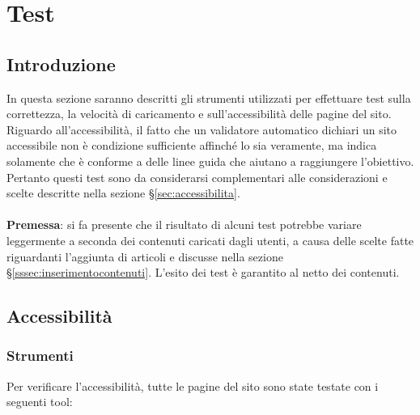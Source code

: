 \documentclass[12pt]{article}
\begin{document}
	\newpage
	\appendix
	
	\section{Test}
	\subsection{Introduzione}
	In questa sezione saranno descritti gli strumenti utilizzati per effettuare test sulla correttezza, la velocità di caricamento e sull'accessibilità delle pagine del sito. \\Riguardo all'accessibilità, il fatto che un validatore automatico dichiari un sito accessibile non è condizione sufficiente affinché lo sia veramente, ma indica solamente che è conforme a delle linee guida che aiutano a raggiungere l'obiettivo. Pertanto questi test sono da considerarsi complementari alle considerazioni e scelte descritte nella sezione §\ref{sec:accessibilita}. \\ \\ 
	\textbf{Premessa}: si fa presente che il risultato di alcuni test potrebbe variare leggermente a seconda dei contenuti caricati dagli utenti, a causa delle scelte fatte riguardanti l'aggiunta di articoli e discusse nella sezione §\ref{sssec:inserimentocontenuti}. L'esito dei test è garantito al netto dei contenuti.
	
	\subsection{Accessibilità} \label{ssec:testaccessibilita}
	
	\subsubsection{Strumenti}
	
	\noindent Per verificare l'accessibilità, tutte le pagine del sito sono state testate con i seguenti tool:
	
\end{document}
